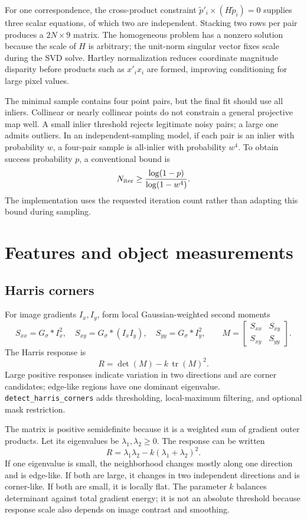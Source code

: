 \documentclass[11pt,a4paper]{article}
\DeclareMathOperator{\tr}{tr}
\newcommand{\1}{\mathbf{1}}
\begin{document}
For one correspondence, the cross-product constraint
$\tilde p'_i\times(H\tilde p_i)=0$ supplies three scalar equations, of which
two are independent. Stacking two rows per pair produces a $2N\times9$ matrix.
The homogeneous problem has a nonzero solution because the scale of $H$ is
arbitrary; the unit-norm singular vector fixes scale during the SVD solve.
Hartley normalization reduces coordinate magnitude disparity before products
such as $x'_ix_i$ are formed, improving conditioning for large pixel values.

The minimal sample contains four point pairs, but the final fit should use all
inliers. Collinear or nearly collinear points do not constrain a general
projective map well. A small inlier threshold rejects legitimate noisy pairs;
a large one admits outliers. In an independent-sampling model, if each pair is
an inlier with probability $w$, a four-pair sample is all-inlier with
probability $w^4$. To obtain success probability $p$, a conventional bound is
\[
 N_{\rm iter}\ge\frac{\log(1-p)}{\log(1-w^4)}.
\]
The implementation uses the requested iteration count rather than adapting
this bound during sampling.

\section{Features and object measurements}

\subsection{Harris corners}

For image gradients $I_x,I_y$, form local Gaussian-weighted second moments
\[
 S_{xx}=G_\sigma*I_x^2,\quad S_{xy}=G_\sigma*(I_xI_y),\quad
 S_{yy}=G_\sigma*I_y^2,
 \qquad
 M=\begin{bmatrix}S_{xx}&S_{xy}\\S_{xy}&S_{yy}\end{bmatrix}.
\]
The Harris response is
\[
  R=\det(M)-k\,\tr(M)^2.
\]
Large positive responses indicate variation in two directions and are corner
candidates; edge-like regions have one dominant eigenvalue. \texttt{detect\_harris\_corners}
adds thresholding, local-maximum filtering, and optional mask restriction.

The matrix is positive semidefinite because it is a weighted sum of gradient
outer products. Let its eigenvalues be $\lambda_1,\lambda_2\ge0$. The response
can be written
\[
 R=\lambda_1\lambda_2-k(\lambda_1+\lambda_2)^2.
\]
If one eigenvalue is small, the neighborhood changes mostly along one
direction and is edge-like. If both are large, it changes in two independent
directions and is corner-like. If both are small, it is locally flat. The
parameter $k$ balances determinant against total gradient energy; it is not an
absolute threshold because response scale also depends on image contrast and
smoothing.
\end{document}
